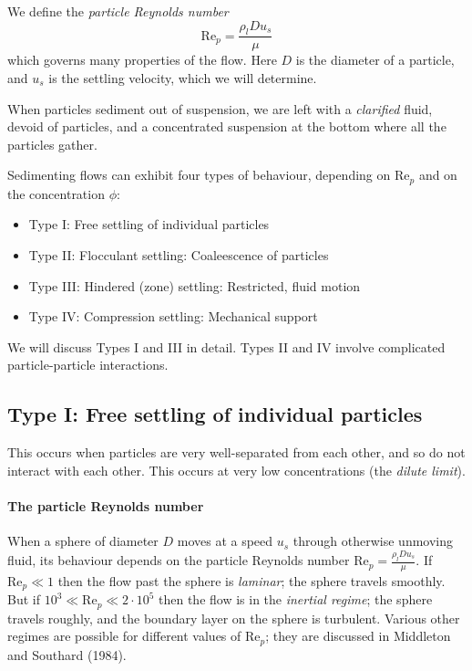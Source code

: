 We define the \textit{particle Reynolds number}
\begin{equation}
    \mathrm{Re}_p = \frac{\rho_l D u_s}{\mu}
\end{equation}
which governs many properties of the flow. Here $D$ is the diameter of a particle, and $u_s$ is the settling velocity, which we will determine. 

When particles sediment out of suspension, we are left with a \textit{clarified} fluid, devoid of particles, and a concentrated suspension at the bottom where all the particles gather. 

Sedimenting flows can exhibit four types of behaviour, depending on $\mathrm{Re}_p$ and on the concentration $\phi$:
\begin{itemize}
    \item Type I: Free settling of individual particles
    \item Type II: Flocculant settling: Coaleescence of particles
    \item Type III: Hindered (zone) settling: Restricted, fluid motion
    \item Type IV: Compression settling: Mechanical support
\end{itemize}
We will discuss Types I and III in detail. Types II and IV involve complicated particle-particle interactions. 

\subsection{Type I: Free settling of individual particles} 

This occurs when particles are very well-separated from each other, and so do not interact with each other. This occurs at very low concentrations (the \textit{dilute limit}).

\paragraph{The particle Reynolds number} When a sphere of diameter $D$ moves at a speed $u_s$ through otherwise unmoving fluid, its behaviour depends on the particle Reynolds number $\mathrm{Re}_p=\frac{\rho_lDu_s}{\mu}$.  If $\mathrm{Re}_p\ll1$ then the flow past the sphere is \textit{laminar}; the sphere travels smoothly. But if $10^3 \ll \mathrm{Re}_p \ll 2\cdot10^5$ then the flow is in the \textit{inertial regime}; the sphere travels roughly, and the boundary layer on the sphere is turbulent. Various other regimes are possible for different values of $\mathrm{Re}_p$; they are discussed in Middleton and Southard (1984). 


